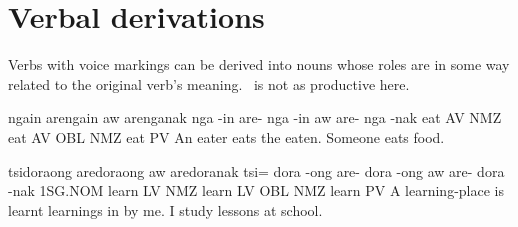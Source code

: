 \section{Verbal derivations}
Verbs with voice markings can be derived into nouns whose roles are
in some way related to the original verb's meaning. \INST~is not as productive
here.
\begin{examples}
	\ex
	\label{ex:eat_food}
	\script ngain arengain aw arenganak
	\bits nga -in are- nga -in aw are- nga -nak
	\gloss eat AV NMZ eat AV OBL NMZ eat PV
	\tr An eater eats the eaten.
	\tr Someone eats food.
\end{examples}

\begin{examples}
	\ex
	\label{ex:learn_school}
	\script tsidoraong aredoraong aw aredoranak
	\bits tsi= dora -ong are- dora -ong aw are- dora -nak
	\gloss 1SG.NOM learn LV NMZ learn LV OBL NMZ learn PV
	\tr A learning-place is learnt learnings in by me.
	\tr I study lessons at school.
\end{examples}